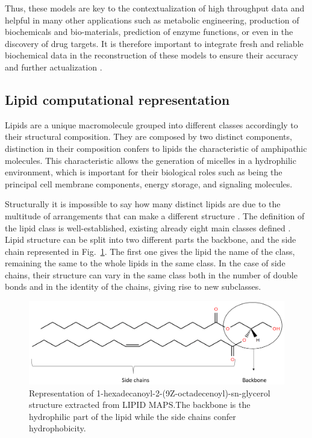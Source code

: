 \documentclass{llncs}
\begin{document}
Thus, these models are key to the contextualization of high throughput data and helpful in many other applications such as metabolic engineering, production of biochemicals and bio-materials, prediction of enzyme functions, or even in the discovery of drug targets\cite{Gu2019,Kim2017}.
It is therefore important to integrate fresh and reliable biochemical data in the reconstruction of these models to ensure their accuracy and further actualization \cite{Moseley2021,Passi2021}. 


\subsection{Lipid computational representation}
Lipids are a unique macromolecule grouped into different classes accordingly to their structural composition. They are composed by two distinct components, distinction in their composition confers to lipids the characteristic of amphipathic molecules. 
This characteristic allows the generation of micelles in a hydrophilic environment, which is important for their biological roles such as being the principal cell membrane components, energy storage, and signaling molecules.

Structurally it is impossible to say how many distinct lipids are due to the multitude of arrangements that can make a different structure \cite{Gyamfi2018}. 
The definition of the lipid class is well-established, existing already eight main classes defined \cite{Fahy2011}.
Lipid structure can be split into two different parts the backbone, and the side chain represented in Fig.~\ref{fig1}. The first one gives the lipid the name of the class, remaining the same to the whole lipids in the same class.
In the case of side chains, their structure can vary in the same class both in the number of double bonds and in the identity of the chains, giving rise to new subclasses.

\begin{figure}
    \includegraphics[width=\textwidth]{imagens/lipido.png}
    \caption{Representation of 1-hexadecanoyl-2-(9Z-octadecenoyl)-sn-glycerol structure extracted from LIPID MAPS.The backbone is the hydrophilic part of the lipid while the side chains confer hydrophobicity.} \label{fig1}
\end{figure}
\end{document}
